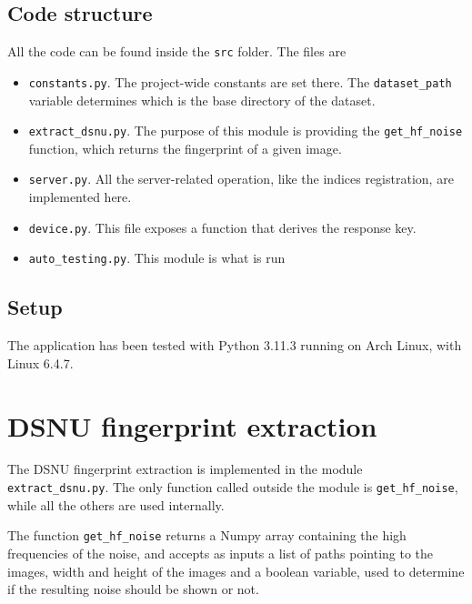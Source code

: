 \subsection{Code structure}\label{sec:projectstructure}
All the code can be found inside the \texttt{src} folder. The files are
\begin{itemize}
\item \texttt{constants.py}. The project-wide constants are set there. The \texttt{dataset\_path} variable determines which is the base directory of the dataset.
\item \texttt{extract\_dsnu.py}. The purpose of this module is providing the \texttt{get\_hf\_noise} function, which returns the fingerprint of a given image.
\item \texttt{server.py}. All the server-related operation, like the indices registration, are implemented here.
\item \texttt{device.py}. This file exposes a function that derives the response key.
\item \texttt{auto\_testing.py}. This module is what is run
\end{itemize}

\subsection{Setup}\label{subsec:setup}
The application has been tested with Python 3.11.3 running on Arch Linux, with Linux 6.4.7.

\section{DSNU fingerprint extraction}\label{sec:dsnu_extraction}
The DSNU fingerprint extraction is implemented in the module \texttt{extract\_dsnu.py}. The only function called outside the module is \texttt{get\_hf\_noise}, while all the others are used internally.

The function \texttt{get\_hf\_noise} returns a Numpy array containing the high frequencies of the noise, and accepts as inputs a list of paths pointing to the images, width and height of the images and a boolean variable, used to determine if the resulting noise should be shown or not.

